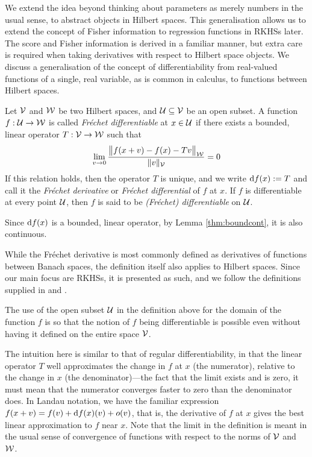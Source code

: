 
We extend the idea beyond thinking about parameters as merely numbers in the usual sense, to abstract objects in Hilbert spaces. 
This generalisation allows us to extend the concept of Fisher information to regression functions in RKHSs later.
The score and Fisher information is derived in a familiar manner, but extra care is required when taking derivatives with respect to Hilbert space objects.  
We discuss a generalisation of the concept of differentiability from real-valued functions of a single, real variable, as is common in calculus, to functions between Hilbert spaces.

\begin{definition}\label{def:frechet}
  Let ${\mathcal V}$ and ${\mathcal W}$ be two Hilbert spaces, and ${\mathcal U} \subseteq {\mathcal V}$ be an open subset.
  A function $f:{\mathcal U}\to{\mathcal W}$ is called \emph{Fréchet differentiable} at $x \in {\mathcal U}$ if there exists a bounded, linear operator $T:{\mathcal V}\to{\mathcal W}$ such that 
  \[
    \lim_{v\to 0} \frac{\big\Vert f(x+v) - f(x) - T v \big\Vert_{{\mathcal W}}}{\lVert v\rVert_{\mathcal V}} = 0
  \]
  If this relation holds, then the operator $T$ is unique, and we write $\text{d} f(x) := T$ and call it the \emph{Fréchet derivative} or \emph{Fréchet differential} of $f$ at $x$.
  If $f$ is differentiable at every point ${\mathcal U}$, then $f$ is said to be \emph{(Fréchet) differentiable} on ${\mathcal U}$.
\end{definition}

\begin{remark}
  Since $\text{d} f(x)$ is a bounded, linear operator, by Lemma \ref{thm:boundcont}, it is also continuous. 
\end{remark}

\begin{remark}
  While the Fréchet derivative is most commonly defined as derivatives of functions between Banach spaces,  the definition itself also applies to Hilbert spaces.
  Since our main focus are RKHSs, it is presented as such, and we follow the definitions supplied in \citet[Definition 3.6.5]{balakrishnan1981applied} and \citet[Section 6]{bouboulis2011extension}.
\end{remark}

\begin{remark}
  The use of the open subset ${\mathcal U}$ in the definition above for the domain of the function $f$ is so that the notion of $f$ being differentiable is possible even without having it defined on the entire space ${\mathcal V}$.
\end{remark}

The intuition here is similar to that of regular differentiability, in that the linear operator $T$ well approximates the change in $f$ at $x$ (the numerator), relative to the change in $x$ (the denominator)---the fact that the limit exists and is zero, it must mean that the numerator converges faster to zero than the denominator does.
In Landau notation, we have the familiar expression $f(x+v) = f(v) + \text{d} f(x)(v) + o(v)$, that is, the derivative of $f$ at $x$ gives the best linear approximation to $f$ near $x$.
Note that the limit in the definition is meant in the usual sense of convergence of functions with respect to the norms of ${\mathcal V}$ and ${\mathcal W}$.

